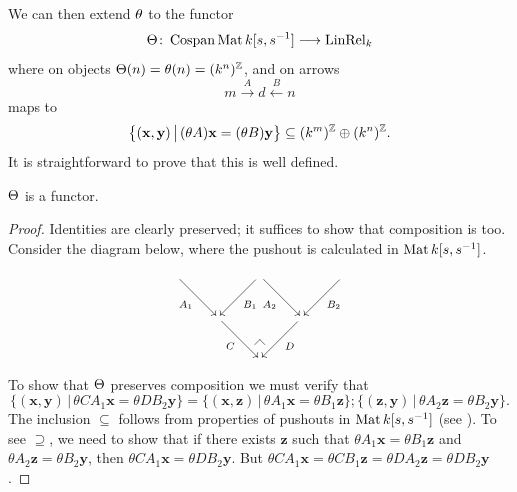 We can then extend $\theta$ to the functor
\[
  \Theta {\colon} \operatorname{{Cospan}}\operatorname{\mathrm{Mat}}{k[s,s^{-1}]} \longrightarrow \operatorname{\mathrm{LinRel}}_k
\]
where on objects $\Theta(n)=\theta(n)=(k^n)^{\mathbb Z}$, and on arrows
\[
  m\xrightarrow{A} d \xleftarrow{B}n
\]
maps to
\begin{equation}\label{eq.K}
  \big\{(\mathbf{x},\mathbf{y}) \,\big|\,
  (\theta A)\mathbf{x} = (\theta B)\mathbf{y}\big\} 
  \subseteq (k^m)^{\mathbb Z} \oplus (k^n)^{\mathbb Z}.
\end{equation}
It is straightforward to prove that this is well defined.
\begin{proposition}\label{prop.funct}
$\Theta$ is a functor.
\end{proposition}
\begin{proof}
Identities are clearly preserved; it suffices to show that composition is too.
Consider the diagram below, where the pushout is calculated in $\operatorname{\mathrm{Mat}}{k[s,s^{-1}]}$.
\[
\xymatrix{
  {}\ar[dr]_{A_1} & & \ar[dl]^{B_1}  
  \ar[dr]_{A_2} & & \ar[dl]^{B_2} {} 
 \\
& \ar[dr]_{C} & & \ar[dl]^{D}  \\
& & {\save*!<0cm,-.5cm>[dl]@^{|-}\restore}
}
\]
To show that $\Theta$ preserves composition we must verify that 
\[
  \{(\mathbf{x},\mathbf{y})\,|\, \theta CA_1\mathbf{x} = \theta DB_2\mathbf{y}\} =
  \{(\mathbf{x},\mathbf{z})\,|\, \theta A_1\mathbf{x} = \theta B_1\mathbf{z}\} ; 
  \{(\mathbf{z},\mathbf{y})\,|\, \theta A_2\mathbf{z} = \theta B_2\mathbf{y}\}.
\]
The inclusion $\subseteq$ follows from properties of pushouts in $\operatorname{\mathrm{Mat}}{k[s,s^{-1}]}$ (see
\cite[Proposition 5.7]{BSZ2}).  To see $\supseteq$, we need to show that if there
exists $\mathbf{z}$ such that $\theta A_1\mathbf{x} = \theta B_1\mathbf{z}$ and
$\theta A_2\mathbf{z} = \theta B_2\mathbf{y}$, then $\theta CA_1\mathbf{x} =
\theta DB_2\mathbf{y}$.  But $\theta CA_1\mathbf{x}=\theta CB_1\mathbf{z}=\theta
DA_2\mathbf{z}=\theta DB_2\mathbf{y}$.
\end{proof}



